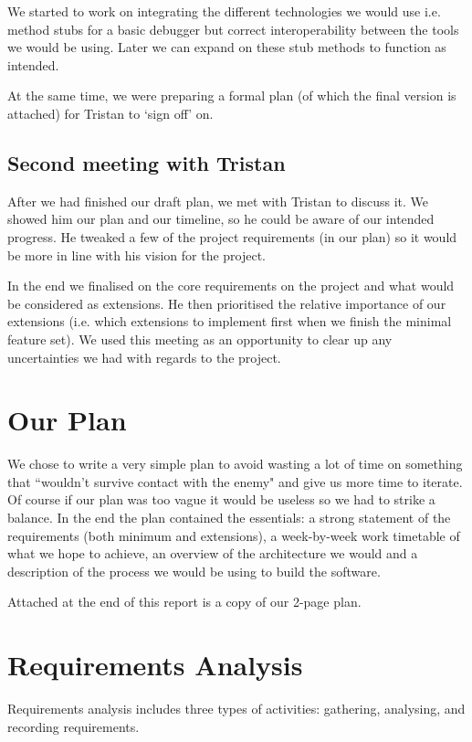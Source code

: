 \documentclass[11pt, a4paper]{article}
\begin{document}
We started to work on integrating the different technologies we would use
i.e. method stubs for a basic debugger but correct interoperability between the
tools we would be using.  Later we can expand on these stub methods to function
as intended.

At the same time, we were preparing a formal plan (of which the final
version is attached) for Tristan to `sign off' on. 

\subsection{Second meeting with Tristan}
After we had finished our draft plan, we met with Tristan to discuss it. We
showed him our plan and our timeline, so he could be aware of our intended
progress. He tweaked a few of the project requirements (in our plan) so it
would be more in line with his vision for the project. 

In the end we finalised on the core requirements on the project and what
would be considered as extensions. He then prioritised the relative
importance of our extensions (i.e. which extensions to implement first when
we finish the minimal feature set). We used this meeting as an
opportunity to clear up any uncertainties we had with regards to the
project.

\section{Our Plan}

We chose to write a very simple plan to avoid wasting a lot of time on something that ``wouldn't survive contact with the enemy" and give us more time to iterate. 
Of course if our plan was too vague it would be useless so we had to strike a balance.
In the end the plan contained the essentials: a strong statement of the requirements (both minimum and extensions), a week-by-week work timetable of what we hope to achieve, an overview of the architecture we would and a description of the process we would be using to build the software.

Attached at the end of this report is a copy of our 2-page plan.

\section{Requirements Analysis}
Requirements analysis includes three types of activities: gathering, analysing, and recording requirements. 
\end{document}
